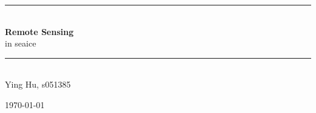\thispagestyle{empty}
\begin{center} %
\newcommand{\HRule}{\rule{\textwidth}{1mm}}
\vspace*{2cm}\hspace{4cm}%
\HRule\\[1cm]\huge{\textbf{
Remote Sensing}}\\[0.7cm]
\huge{in seaice}\\[1cm]
\HRule\\[3cm]
\large{Ying Hu, s051385\\[0.7cm]
      }

 \vspace{2cm}
\end{center}
\begin{flushleft}
\today\\
\vspace{0,5cm}
\end{flushleft}
\thispagestyle{empty}


